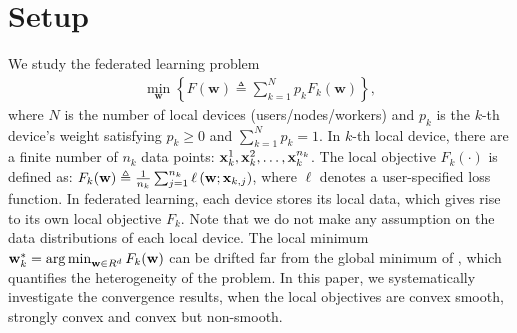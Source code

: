 

\section{Setup}


We study the federated learning problem
\begin{align}
	\min _{\mathbf{w}}\left\{F(\mathbf{w}) \triangleq \sum_{k=1}^{N} p_{k} F_{k}(\mathbf{w})\right\},
	\label{eq:problem}
\end{align}
where $N$ is the number of local devices (users/nodes/workers) and $p_k$ is the $k$-th device's weight satisfying $p_k \geq 0$ and $\sum_{k=1}^N p_k = 1$. 
In $k$-th local device, there are a finite number of $n_k$ data points:
${\mathbf{x}}_k^1, {\mathbf{x}}_k^2, \dots, {\mathbf{x}}_k^{n_k}$.  
The local objective $F_k(\cdot)$ is defined as:
$F_{k}(\mathbf{w}) \triangleq \frac{1}{n_{k}} \sum_{j=1}^{n_{k}} \ell\left(\mathbf{w} ; {\mathbf{x}}_{k, j}\right)$,
where $\ell$ denotes a user-specified loss function. In federated learning, each device stores its local data, which gives rise to its own local objective $F_k$. Note that we do not make any assumption on the
data distributions of each local device. The local minimum
${\mathbf{w}}^{*}_k= \operatorname*{arg\,min}_{{\mathbf{w}} \in R^d} F_k({\mathbf{w}})$ can be drifted far from
the global minimum of \eq{\ref{eq:problem}}, which quantifies the 
heterogeneity of the problem.
In this paper, we systematically investigate the convergence results, 
when the local objectives are convex smooth, strongly convex and convex but
non-smooth.



